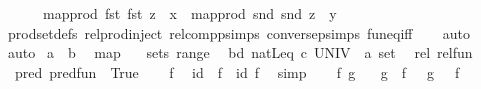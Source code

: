 \begin{isabellebody}
\ \ \ \ \ \ map{\isacharunderscore}{\kern0pt}prod\ fst\ fst\ z\ {\isacharequal}{\kern0pt}\ x\ {\isasymand}\ map{\isacharunderscore}{\kern0pt}prod\ snd\ snd\ z\ {\isacharequal}{\kern0pt}\ y{\isacharparenright}{\kern0pt}{\isachardoublequoteclose}\isanewline
\ \ \isamarkupfalse%
\ prod{\isacharunderscore}{\kern0pt}set{\isacharunderscore}{\kern0pt}defs\ rel{\isacharunderscore}{\kern0pt}prod{\isacharunderscore}{\kern0pt}inject\ relcompp{\isachardot}{\kern0pt}simps\ conversep{\isachardot}{\kern0pt}simps\ fun{\isacharunderscore}{\kern0pt}eq{\isacharunderscore}{\kern0pt}iff\isanewline
\ \ \isamarkupfalse%
\ auto\isanewline
{}\isamarkupfalse%
\ auto%
\endisatagproof
{\isafoldproof}%
%
\isadelimproof
\isanewline
%
\endisadelimproof
\isanewline
{}\isamarkupfalse%
\ {\isachardoublequoteopen}{\isacharprime}{\kern0pt}a\ {\isasymRightarrow}\ {\isacharprime}{\kern0pt}b{\isachardoublequoteclose}\isanewline
\ \ map{\isacharcolon}{\kern0pt}\ {\isachardoublequoteopen}{\isacharparenleft}{\kern0pt}{\isasymcirc}{\isacharparenright}{\kern0pt}{\isachardoublequoteclose}\isanewline
\ \ sets{\isacharcolon}{\kern0pt}\ range\isanewline
\ \ bd{\isacharcolon}{\kern0pt}\ {\isachardoublequoteopen}natLeq\ {\isacharplus}{\kern0pt}c\ {\isacharbar}{\kern0pt}UNIV\ {\isacharcolon}{\kern0pt}{\isacharcolon}{\kern0pt}\ {\isacharprime}{\kern0pt}a\ set{\isacharbar}{\kern0pt}{\isachardoublequoteclose}\isanewline
\ \ rel{\isacharcolon}{\kern0pt}\ {\isachardoublequoteopen}rel{\isacharunderscore}{\kern0pt}fun\ {\isacharparenleft}{\kern0pt}{\isacharequal}{\kern0pt}{\isacharparenright}{\kern0pt}{\isachardoublequoteclose}\isanewline
\ \ pred{\isacharcolon}{\kern0pt}\ {\isachardoublequoteopen}pred{\isacharunderscore}{\kern0pt}fun\ {\isacharparenleft}{\kern0pt}{\isasymlambda}{\isacharunderscore}{\kern0pt}{\isachardot}{\kern0pt}\ True{\isacharparenright}{\kern0pt}{\isachardoublequoteclose}\isanewline
%
\isadelimproof
%
\endisadelimproof
%
\isatagproof
{}\isamarkupfalse%
\isanewline
\ \ \isamarkupfalse%
\ f\ \isamarkupfalse%
\ {\isachardoublequoteopen}id\ {\isasymcirc}\ f\ {\isacharequal}{\kern0pt}\ id\ f{\isachardoublequoteclose}\ \isamarkupfalse%
\ simp\isanewline
{}\isamarkupfalse%
\isanewline
\ \ \isamarkupfalse%
\ f\ g\ \isamarkupfalse%
\ {\isachardoublequoteopen}{\isacharparenleft}{\kern0pt}{\isasymcirc}{\isacharparenright}{\kern0pt}\ {\isacharparenleft}{\kern0pt}g\ {\isasymcirc}\ f{\isacharparenright}{\kern0pt}\ {\isacharequal}{\kern0pt}\ {\isacharparenleft}{\kern0pt}{\isasymcirc}{\isacharparenright}{\kern0pt}\ g\ {\isasymcirc}\ {\isacharparenleft}{\kern0pt}{\isasymcirc}{\isacharparenright}{\kern0pt}\ f{\isachardoublequoteclose}\isanewline

\end{isabellebody}
